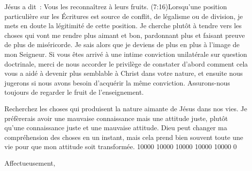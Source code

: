 \begin{pocketpar}{}
Jésus a dit~: \og Vous les reconnaîtrez à leurs fruits. \fg{}
 (7:16)Lorsqu'une position particulière
 sur les Écritures est source de conflit, de légalisme ou de division,
 je mets en doute la légitimité de cette position.
 Je cherche plutôt à tendre vers les choses qui vont me rendre plus aimant et bon,
 pardonnant plus et faisant preuve de plus de miséricorde.
 Je sais alors que je deviens de plus en plus à l'image de mon Seigneur.
Si vous êtes arrivé à une intime conviction unilatérale sur question doctrinale,
 merci de nous accorder le privilège de constater d'abord comment cela
 vous a aidé à devenir plus semblable à Christ dans votre nature,
 et ensuite nous jugerons si nous avons besoin d'acquérir la même conviction.
 Assurons-nous toujours de regarder le fruit de l'enseignement.
\end{pocketpar}

\begin{pocketpar}{}
Recherchez les choses qui produisent la nature \digestlinebreak
 aimante de Jésus dans nos vies.
 Je préfèrerais avoir une mauvaise connaissance mais une attitude juste, \pocketlinebreak
 plutôt qu'une connaissance juste et une mauvaise \digestlinebreak
 attitude.
 Dieu peut changer ma compréhension des choses en un instant,
 mais cela prend bien \digestlinebreak
 souvent toute une vie pour que mon attitude \digestlinebreak\pocketlinebreak
 soit transformée.
 \begingroup{} 10000 10000 10000 10000 10000 0
 \par\endgroup
\end{pocketpar}


\nobreak
\vspace{5mm}
Affectueusement,

\nobreak
\signature{Chuck Smith}

\closechapter

